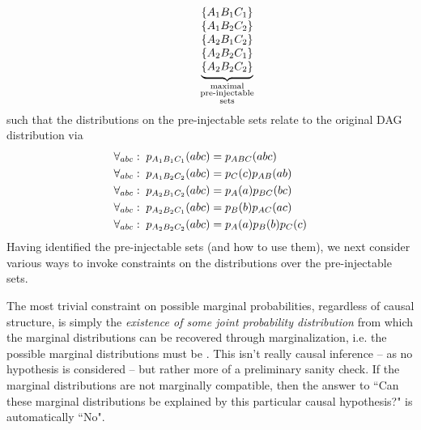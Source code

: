 \begin{align}
\qquad\quad
{\underbrace{\begin{matrix}
\\
\left\lbrace A_1 B_1 C_1\right\rbrace \\
\left\lbrace A_1 B_2 C_2\right\rbrace \\
\left\lbrace A_2 B_1 C_2\right\rbrace \\
\left\lbrace A_2 B_2 C_1\right\rbrace \\
\left\lbrace A_2 B_2 C_2\right\rbrace
\end{matrix}}_{\substack{\text{maximal}\\\text{pre-injectable}\\\text{sets}}}}
\end{align}
such that the distributions on the pre-injectable sets relate to the original DAG distribution via
\begin{align}\label{eq:preinjectableuses222}
\begin{split}
&\forall_{a b c}:\; \p[A_1 B_1 C_1]{a b c} = \p[A B C]{a b c} \\
&\forall_{a b c}:\; \p[A_1 B_2 C_2]{a b c} = \p[C]{c}\p[A B]{a b}\\%
&\forall_{a b c}:\; \p[A_2 B_1 C_2]{a b c} = \p[A]{a}\p[B C]{b c}\\
&\forall_{a b c}:\; \p[A_2 B_2 C_1]{a b c} = \p[B]{b}\p[A C]{a c}\\
&\forall_{a b c}:\; \p[A_2 B_2 C_2]{a b c} = \p[A]{a}\p[B]{b}\p[C]{c}
\end{split}
\end{align}
Having identified the pre-injectable sets (and how to use them), we next consider various ways to invoke constraints on the distributions over the pre-injectable sets.


\label{step:marginalsproblem}

The most trivial constraint on possible marginal probabilities, regardless of causal structure,  
is simply the \emph{existence of some joint probability distribution} from which the marginal distributions can be recovered through marginalization, i.e. the possible marginal distributions must be . This isn't really causal inference -- as no hypothesis is considered -- but rather more of a preliminary sanity check. If the marginal distributions are not marginally compatible, then the answer to ``Can these marginal distributions be explained by this particular causal hypothesis?" is automatically ``No". 


